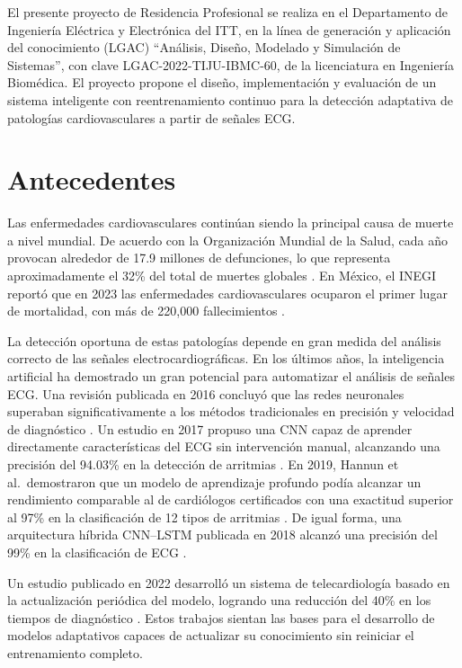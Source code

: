 \documentclass[11pt,spanish]{citedi}
\begin{document}
El presente proyecto de Residencia Profesional se realiza en el Departamento de Ingeniería Eléctrica y Electrónica del ITT, en la línea de generación y aplicación del conocimiento (LGAC) ``Análisis, Diseño, Modelado y Simulación de Sistemas'', con clave LGAC-2022-TIJU-IBMC-60, de la licenciatura en Ingeniería Biomédica. El proyecto propone el diseño, implementación y evaluación de un sistema inteligente con reentrenamiento continuo para la detección adaptativa de patologías cardiovasculares a partir de señales ECG.

\section{Antecedentes}

Las enfermedades cardiovasculares continúan siendo la principal causa de muerte a nivel mundial. De acuerdo con la Organización Mundial de la Salud, cada año provocan alrededor de 17.9 millones de defunciones, lo que representa aproximadamente el 32\% del total de muertes globales \cite{WHO2024}. En México, el INEGI reportó que en 2023 las enfermedades cardiovasculares ocuparon el primer lugar de mortalidad, con más de 220,000 fallecimientos \cite{INEGI2024}.

La detección oportuna de estas patologías depende en gran medida del análisis correcto de las señales electrocardiográficas. En los últimos años, la inteligencia artificial ha demostrado un gran potencial para automatizar el análisis de señales ECG. Una revisión publicada en 2016 concluyó que las redes neuronales superaban significativamente a los métodos tradicionales en precisión y velocidad de diagnóstico \cite{Luz2016}. Un estudio en 2017 propuso una CNN capaz de aprender directamente características del ECG sin intervención manual, alcanzando una precisión del 94.03\% en la detección de arritmias \cite{Acharya2017}. En 2019, Hannun et al.\ demostraron que un modelo de aprendizaje profundo podía alcanzar un rendimiento comparable al de cardiólogos certificados con una exactitud superior al 97\% en la clasificación de 12 tipos de arritmias \cite{Hannun2019}. De igual forma, una arquitectura híbrida CNN--LSTM publicada en 2018 alcanzó una precisión del 99\% en la clasificación de ECG \cite{AlRahhal2018}.

Un estudio publicado en 2022 desarrolló un sistema de telecardiología basado en la actualización periódica del modelo, logrando una reducción del 40\% en los tiempos de diagnóstico \cite{Reddy2022}. Estos trabajos sientan las bases para el desarrollo de modelos adaptativos capaces de actualizar su conocimiento sin reiniciar el entrenamiento completo.
\end{document}
